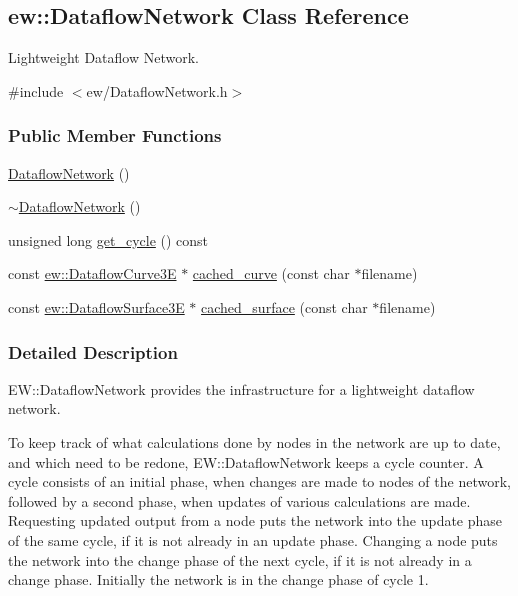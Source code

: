 \hypertarget{classew_1_1DataflowNetwork}{
\subsection{ew::DataflowNetwork Class Reference}
\label{classew_1_1DataflowNetwork}
}


Lightweight Dataflow Network.  




{\ttfamily \#include $<$ew/DataflowNetwork.h$>$}

\subsubsection*{Public Member Functions}
\begin{DoxyCompactItemize}
\item 
\hyperlink{classew_1_1DataflowNetwork_ab242538a954258848964351243fb8dd2}{DataflowNetwork} ()
\item 
\hyperlink{classew_1_1DataflowNetwork_afd33505274dcba0faee9a66d07af8f7c}{$\sim$DataflowNetwork} ()
\item 
unsigned long \hyperlink{classew_1_1DataflowNetwork_a07f32aa66b2ba19b133478d6f4ef29df}{get\_\-cycle} () const 
\item 
const \hyperlink{classew_1_1DataflowCurve3E}{ew::DataflowCurve3E} $\ast$ \hyperlink{classew_1_1DataflowNetwork_a584fb4f8718ba69bd97e7f50682a1096}{cached\_\-curve} (const char $\ast$filename)
\item 
const \hyperlink{classew_1_1DataflowSurface3E}{ew::DataflowSurface3E} $\ast$ \hyperlink{classew_1_1DataflowNetwork_a596c51c6fc7684ee5bc5147ba5eaf3f5}{cached\_\-surface} (const char $\ast$filename)
\end{DoxyCompactItemize}


\subsubsection{Detailed Description}
EW::DataflowNetwork provides the infrastructure for a lightweight dataflow network.

To keep track of what calculations done by nodes in the network are up to date, and which need to be redone, EW::DataflowNetwork keeps a cycle counter. A cycle consists of an initial phase, when changes are made to nodes of the network, followed by a second phase, when updates of various calculations are made. Requesting updated output from a node puts the network into the update phase of the same cycle, if it is not already in an update phase. Changing a node puts the network into the change phase of the next cycle, if it is not already in a change phase. Initially the network is in the change phase of cycle 1.


